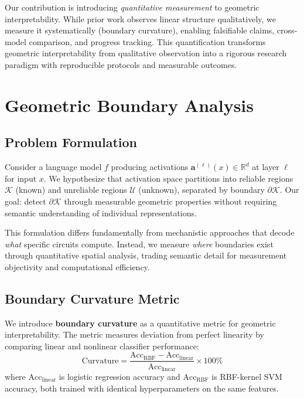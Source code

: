 \documentclass[11pt]{article}
\begin{document}
Our contribution is introducing \textit{quantitative measurement} to geometric interpretability. While prior work observes linear structure qualitatively, we measure it systematically (boundary curvature), enabling falsifiable claims, cross-model comparison, and progress tracking. This quantification transforms geometric interpretability from qualitative observation into a rigorous research paradigm with reproducible protocols and measurable outcomes.

\section{Geometric Boundary Analysis}
\label{sec:method}

\subsection{Problem Formulation}
Consider a language model $f$ producing activations $\mathbf{a}^{(\ell)}(x) \in \mathbb{R}^d$ at layer $\ell$ for input $x$. We hypothesize that activation space partitions into reliable regions $\mathcal{K}$ (known) and unreliable regions $\mathcal{U}$ (unknown), separated by boundary $\partial\mathcal{K}$. Our goal: detect $\partial\mathcal{K}$ through measurable geometric properties without requiring semantic understanding of individual representations.

This formulation differs fundamentally from mechanistic approaches that decode \textit{what} specific circuits compute. Instead, we measure \textit{where} boundaries exist through quantitative spatial analysis, trading semantic detail for measurement objectivity and computational efficiency.

\subsection{Boundary Curvature Metric}
We introduce \textbf{boundary curvature} as a quantitative metric for geometric interpretability. The metric measures deviation from perfect linearity by comparing linear and nonlinear classifier performance:
\begin{equation}
\text{Curvature} = \frac{\text{Acc}_{\text{RBF}} - \text{Acc}_{\text{linear}}}{\text{Acc}_{\text{linear}}} \times 100\%
\end{equation}
where $\text{Acc}_{\text{linear}}$ is logistic regression accuracy and $\text{Acc}_{\text{RBF}}$ is RBF-kernel SVM accuracy, both trained with identical hyperparameters on the same features.
\end{document}
